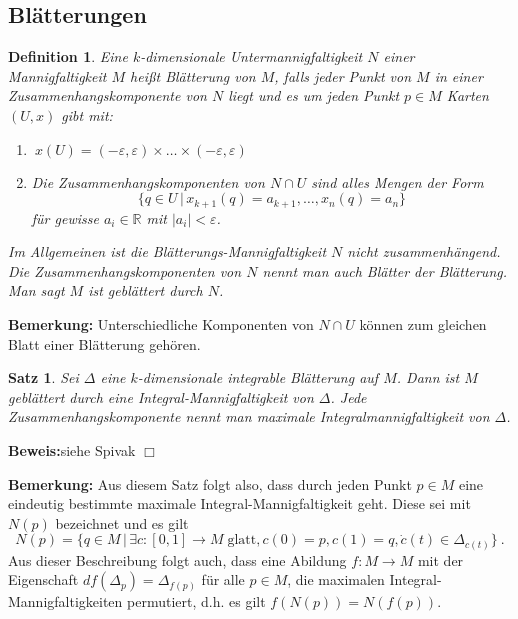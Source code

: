 \documentclass[12pt,a4paper]{article}
\def\R{\mathbb{R}}
\newtheorem{Satz}[Lemma]{Satz}
\newtheorem{Definition}[Lemma]{Definition}
\def\proof{\noindent\textbf{Beweis:}\quad}
\def\qed{\quad\hfill\ensuremath{\Box}}
\begin{document}
\bigskip

\subsection{Bl\"atterungen}

\begin{Definition}
Eine $k$-dimensionale Untermannigfaltigkeit $N$ einer Mannigfaltigkeit $M$
hei\ss t {\em Bl\"atterung} von $M$, falls jeder Punkt von $M$ in einer Zusammenhangskomponente von $N$
liegt und es um jeden Punkt $p\in M$ Karten $(U,x)$ gibt mit:
\begin{enumerate}
\item
$\ x(U) = (-\varepsilon, \varepsilon) \times \ldots \times  (-\varepsilon, \varepsilon)  $
\item
Die Zusammenhangskomponenten von $N\cap U$ sind alles Mengen der Form
$$
\{q\in U \,|\, x_{k+1}(q)= a_{k+1}, \ldots, x_n(q)=a_n\}
$$
f\"ur gewisse $a_i \in \R$ mit $|a_i| <\varepsilon$.
\end{enumerate}
Im Allgemeinen ist die Bl\"atterungs-Mannigfaltigkeit
 $N$ nicht zusammenh\"angend. Die Zusammenhangskomponenten von $N$ nennt man
auch {\em Bl\"atter} der Bl\"atterung. Man sagt $M$ ist gebl\"attert durch $N$.
\end{Definition}

\bigskip

{\bf Bemerkung:}
Unterschiedliche Komponenten von $N\cap U$ k\"onnen zum gleichen Blatt einer Bl\"atterung geh\"oren.

\bigskip

\begin{Satz}\label{blaetter}
Sei $\Delta$ eine $k$-dimensionale integrable Bl\"atterung auf $M$. Dann ist $M$ gebl\"attert durch
eine Integral-Mannigfaltigkeit von $\Delta$. Jede Zusammenhangskomponente nennt man maximale
Integralmannigfaltigkeit von $\Delta$.
\end{Satz}
\proof siehe Spivak \qed

\bigskip

{\bf Bemerkung:} Aus diesem Satz folgt also, dass durch jeden Punkt $p\in M$ eine eindeutig
bestimmte maximale Integral-Mannigfaltigkeit geht. Diese sei mit $N(p)$ bezeichnet und
es gilt
$$
N(p) = \{q \in M \,|\, \exists c:[0,1]\rightarrow M \;\mbox{glatt}, c(0)=p, c(1)=q, \dot c(t) \in \Delta_{c(t)}\} \ .
$$
Aus dieser Beschreibung folgt auch, dass eine Abildung $f:M\rightarrow M$ mit
der Eigenschaft
$df(\Delta_p) = \Delta_{f(p)}$ f\"ur alle $p\in M$, die maximalen Integral-Mannigfaltigkeiten permutiert, d.h.
es gilt $f(N(p)) = N(f(p))$.
\end{document}
